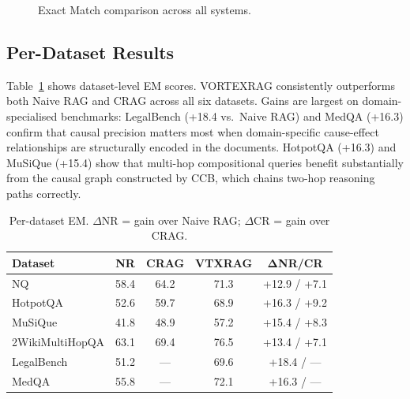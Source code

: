\documentclass[10pt,twocolumn]{article}
\begin{document}
\begin{figure}[h]
\centering
{}
\caption{Exact Match comparison across all systems.}
\label{fig:em_bar}
\end{figure}

\subsection{Per-Dataset Results}

Table~\ref{tab:perdataset} shows dataset-level EM scores.  VORTEXRAG
consistently outperforms both Naive RAG and CRAG across all six datasets.
Gains are largest on domain-specialised benchmarks: LegalBench (+18.4 vs.\
Naive RAG) and MedQA (+16.3) confirm that causal precision matters most when
domain-specific cause-effect relationships are structurally encoded in the
documents.  HotpotQA (+16.3) and MuSiQue (+15.4) show that multi-hop
compositional queries benefit substantially from the causal graph constructed
by CCB, which chains two-hop reasoning paths correctly.

\begin{table}[h]
\centering
\caption{Per-dataset EM.  $\Delta$NR = gain over Naive RAG; $\Delta$CR = gain over CRAG.}
\label{tab:perdataset}
\footnotesize
\setlength{\tabcolsep}{4pt}
\begin{tabular}{@{}lcccc@{}}
\toprule
\textbf{Dataset} & \textbf{NR} & \textbf{CRAG} & \textbf{VTXRAG} & $\boldsymbol{\Delta}$\textbf{NR}/\textbf{CR} \\
\midrule
NQ               & 58.4 & 64.2 & 71.3 & +12.9 / +7.1 \\
HotpotQA         & 52.6 & 59.7 & 68.9 & +16.3 / +9.2 \\
MuSiQue          & 41.8 & 48.9 & 57.2 & +15.4 / +8.3 \\
2WikiMultiHopQA  & 63.1 & 69.4 & 76.5 & +13.4 / +7.1 \\
LegalBench       & 51.2 & ---  & 69.6 & +18.4 / --- \\
MedQA            & 55.8 & ---  & 72.1 & +16.3 / --- \\
\bottomrule
\end{tabular}
\end{table}
\end{document}
